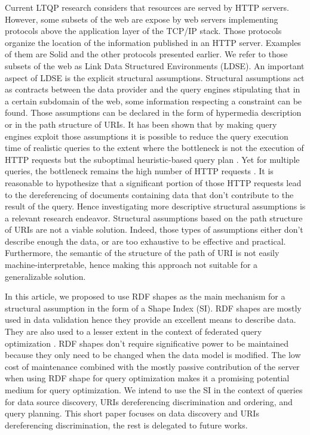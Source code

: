 Current LTQP research considers that resources are served by HTTP servers.
However, some subsets of the web are expose by web servers implementing protocols above the application layer of the TCP/IP stack.
Those protocols organize the location of the information published in an HTTP server.
Examples of them are Solid and the other protocols presented earlier.
We refer to those subsets of the web as Link Data Structured Environments (LDSE).
An important aspect of LDSE is the explicit structural assumptions.
Structural assumptions act as contracts between the data provider and 
the query engines stipulating that in a certain subdomain of the web, some information respecting a constraint can be found.
Those assumptions can be declared in the form of hypermedia description \cite{Fielding} or in the path structure of URIs.
It has been shown that by making query engines exploit those assumptions it is possible to reduce the query execution time
of realistic queries to the extent where the bottleneck is not the execution of 
HTTP requests but the suboptimal heuristic-based query plan \cite{eschauzier_quweda_2023, Taelman2023}.
Yet for multiple queries, the bottleneck remains the high number of HTTP requests  \cite{eschauzier_quweda_2023}.
It is reasonable to hypothesize that a significant portion of those HTTP requests lead to the dereferencing of
documents containing data that don't contribute to the result of the query.
Hence investigating more descriptive structural assumptions is a relevant research endeavor.
Structural assumptions based on the path structure of URIs are not a viable solution.
Indeed, those types of assumptions either don't describe enough the data, or are too exhaustive to be effective and practical.
Furthermore, the semantic of the structure of the path of URI is not easily machine-interpretable, hence
making this approach not suitable for a generalizable solution.

In this article, we proposed to use RDF shapes as the main mechanism for a structural assumption in the form of a Shape Index (SI).
RDF shapes are mostly used in data validation \cite{Gayo2018a} hence they provide an excellent means to describe data.
They are also used to a lesser extent in the context of federated query optimization \cite{kashif2021}.
RDF shapes don't require significative power to be maintained because they only need to be changed 
when the data model is modified.
The low cost of maintenance combined with the mostly passive contribution of 
the server when using RDF shape for query optimization makes it a promising potential medium for query optimization. 
We intend to use the SI in the context of queries for data source discovery, URIs dereferencing discrimination and ordering, and query planning.
This short paper focuses on data discovery and URIs dereferencing discrimination,
the rest is delegated to future works.
